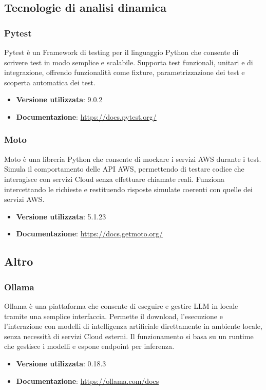 \documentclass[a4paper,12pt]{article}
\begin{document}
\subsection{Tecnologie di analisi dinamica} \label{subsec:tecnologie_analisi_dinamica}

\subsubsection{Pytest}
Pytest è un Framework di testing per il linguaggio Python che consente di scrivere test in modo semplice e scalabile. Supporta test funzionali, unitari e di integrazione, offrendo funzionalità come fixture, parametrizzazione dei test e scoperta automatica dei test.
\begin{itemize}
    \item \textbf{Versione utilizzata}: 9.0.2
    \item \textbf{Documentazione}: \url{https://docs.pytest.org/}
\end{itemize}

\subsubsection{Moto}
Moto è una libreria Python che consente di mockare i servizi AWS durante i test. Simula il comportamento delle API AWS, permettendo di testare codice che interagisce con servizi Cloud senza effettuare chiamate reali. Funziona intercettando le richieste e restituendo risposte simulate coerenti con quelle dei servizi AWS.
\begin{itemize}
    \item \textbf{Versione utilizzata}: 5.1.23
    \item \textbf{Documentazione}: \url{https://docs.getmoto.org/}
\end{itemize}

\subsection{Altro} \label{subsec:altro}

\subsubsection{Ollama}
Ollama è una piattaforma che consente di eseguire e gestire LLM in locale tramite una semplice interfaccia. Permette il download, l'esecuzione e l'interazione con modelli di intelligenza artificiale direttamente in ambiente locale, senza necessità di servizi Cloud esterni. Il funzionamento si basa su un runtime che gestisce i modelli e espone endpoint per inferenza.
\begin{itemize}
    \item \textbf{Versione utilizzata}: 0.18.3
    \item \textbf{Documentazione}: \url{https://ollama.com/docs}
\end{itemize}
\end{document}
